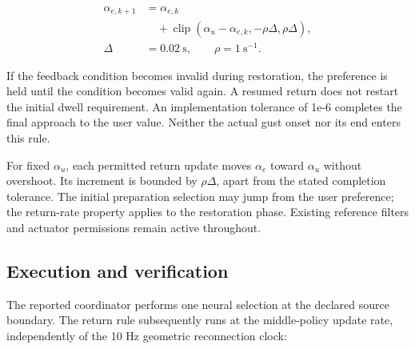 \documentclass[journal]{IEEEtran}
\begin{document}
\begin{equation}\begin{aligned}
\alpha_{e,k+1}&=\alpha_{e,k}\\
&\quad+\operatorname{clip}(\alpha_u-\alpha_{e,k},-\rho\Delta,\rho\Delta),\\
\Delta&=0.02\ \mathrm{s},\qquad \rho=1\ \mathrm{s}^{-1}.
\end{aligned}\end{equation}

If the feedback condition becomes invalid during restoration, the preference is held until the condition becomes valid again. A resumed return does not restart the initial dwell requirement. An implementation tolerance of 1e-6 completes the final approach to the user value. Neither the actual gust onset nor its end enters this rule.


For fixed $\alpha_u$, each permitted return update moves $\alpha_e$ toward $\alpha_u$ without overshoot. Its increment is bounded by $\rho\Delta$, apart from the stated completion tolerance. The initial preparation selection may jump from the user preference; the return-rate property applies to the restoration phase. Existing reference filters and actuator permissions remain active throughout.


\subsection{Execution and verification}

The reported coordinator performs one neural selection at the declared source boundary. The return rule subsequently runs at the middle-policy update rate, independently of the 10 Hz geometric reconnection clock:
\end{document}
